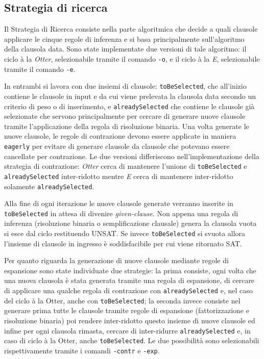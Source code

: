 \documentclass[a4paper,11pt]{article}
\begin{document}
\subsection{Strategia di ricerca}
Il Strategia di Ricerca consiste nella parte algoritmica che decide a quali clausole applicare le cinque regole di inferenza e si basa principalmente sull'algoritmo della clausola data. Sono state implementate due versioni di tale algoritmo: il ciclo à la \emph{Otter}, selezionabile tramite il comando \texttt{-o}, e il ciclo à la \emph{E}, selezionabile tramite il comando \texttt{-e}. \par
In entrambi si lavora con due insiemi di clausole: \texttt{toBeSelected}, che all'inizio contiene le clausole in input e da cui viene prelevata la clausola data secondo un criterio di peso o di inserimento, e \texttt{alreadySelected} che contiene le clausole già selezionate che servono principalmente per cercare di generare nuove clausole tramite l'applicazione della regola di risoluzione binaria. Una volta generate le nuove clausole, le regole di contrazione devono essere applicate in maniera \texttt{eagerly} per evitare di generare clausole da clausole che potevano essere cancellate per contrazione. Le due versioni differiscono nell'implementazione della strategia di contrazione: \emph{Otter} cerca di mantenere l'unione di \texttt{toBeSelected} e \texttt{alreadySelected} inter-ridotto mentre \emph{E} cerca di mantenere inter-ridotto solamente \texttt{alreadySelected}.\par 
Alla fine di ogni iterazione le nuove clausole generate verranno inserite in \texttt{toBeSelected} in attesa di divenire \emph{given-clause}. Non appena una regola di inferenza (risoluzione binaria o semplificazione clausale) genera la clausola vuota si esce dal ciclo restituendo UNSAT. Se invece \texttt{toBeSelected} si svuota allora l'insieme di clausole in ingresso è soddisfacibile per cui viene ritornato SAT. \par
Per quanto riguarda la generazione di nuove clausole mediante regole di espansione sono state individuate due strategie: 
la prima consiste, ogni volta che una nuova clausola è stata generata tramite una regola di espansione, di cercare di applicare una qualche regola di contrazione con \texttt{alreadySelected} e, nel caso del ciclo à la Otter, anche con \texttt{toBeSelected}; la seconda invece consiste nel generare prima tutte le clausole tramite regole di espansione (fattorizzazione e risoluzione binaria) poi rendere inter-ridotto questo insieme di nuove clausole ed infine per ogni clausola rimasta, cercare di inter-ridurre \texttt{alreadySelected} e, in caso di ciclo à la Otter, anche \texttt{toBeSelected}. Le due possibilità sono selezionabili rispettivamente tramite i comandi \texttt{-contr} e \texttt{-exp}.\par
\end{document}
